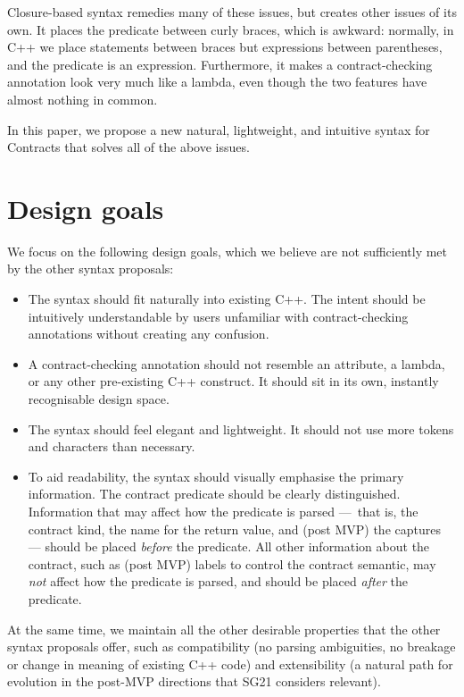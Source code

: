 Closure-based syntax \cite{P2461R1} remedies many of these issues, but creates other issues of its own. It places the predicate between curly braces, which is awkward: normally, in C++ we place statements between braces but expressions between parentheses, and the predicate is an expression. Furthermore, it makes a contract-checking annotation look very much like a lambda, even though the two features have almost nothing in common.

In this paper, we propose a new natural, lightweight, and intuitive syntax for Contracts that solves all of the above issues.

\section{Design goals}
\label{sec:design}

We focus on the following design goals, which we believe are not sufficiently met by the other syntax proposals:

\begin{itemize}
\item The syntax should fit naturally into existing C++. The intent should be intuitively understandable by users unfamiliar with contract-checking annotations without creating any confusion.
\item A contract-checking annotation should not resemble an attribute, a lambda, or any other pre-existing C++ construct. It should sit in its own, instantly recognisable design space.
\item The syntax should feel elegant and lightweight. It should not use more tokens and characters than necessary.
\item To aid readability, the syntax should visually emphasise the primary information. The contract predicate should be clearly distinguished. Information that may affect how the predicate is parsed --- that is, the contract kind, the name for the return value, and (post MVP) the captures --- should be placed \emph{before} the predicate. All other information about the contract, such as (post MVP) labels to control the contract semantic, may \emph{not} affect how the predicate is parsed, and should be placed \emph{after} the predicate.
\end{itemize}

 At the same time, we maintain all the other desirable properties that the other syntax proposals offer, such as compatibility (no parsing ambiguities, no breakage or change in meaning of existing C++ code) and extensibility (a natural path for evolution in the post-MVP directions that SG21 considers relevant).

